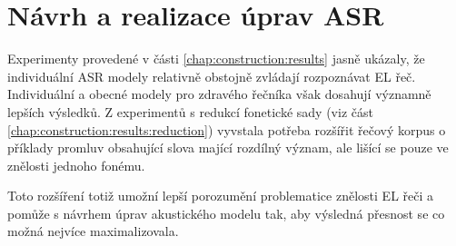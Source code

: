 \chapter{Návrh a realizace úprav ASR}
\label{chap:realisation}

Experimenty provedené v části \ref{chap:construction:results} jasně ukázaly, že individuální ASR modely relativně obstojně zvládají rozpoznávat EL řeč. Individuální a obecné modely pro zdravého řečníka však dosahují významně lepších výsledků. Z experimentů s redukcí fonetické sady (viz část \ref{chap:construction:results:reduction}) vyvstala potřeba rozšířit řečový korpus o příklady promluv obsahující slova mající rozdílný význam, ale lišící se pouze ve znělosti jednoho fonému.

Toto rozšíření totiž umožní lepší porozumění problematice znělosti EL řeči a pomůže s návrhem úprav akustického modelu tak, aby výsledná přesnost se co možná nejvíce maximalizovala.










